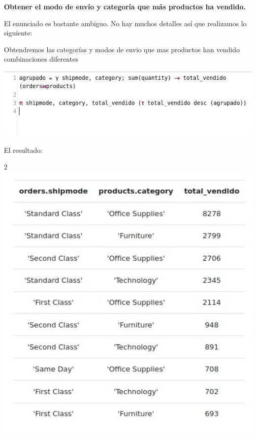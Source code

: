 \textbf{Obtener el modo de envío y categoría que más productos ha vendido.}

El enunciado es bastante ambiguo. No hay muchos detalles así que realizamos lo siguiente:

Obtendremos las categorías y modos de envio que mas productos han vendido combinaciones diferentes

\begin{center}
    \includegraphics[width=14cm]{resources/pregunta2/2.7.1.png} \\
\end{center}
El resultado:
\begin{center}2
    \includegraphics[width=14cm]{resources/pregunta2/2.7.2.png} \\
\end{center}
